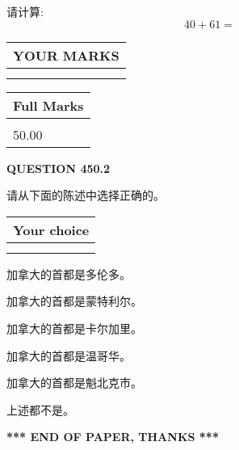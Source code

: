 \documentclass{ctexart}
\begin{document}
  
 
请计算:
\begin{equation}
40 +  %
61 = \nonumber
\end{equation}
 

 

 
  
\vspace{0.2in}
  
\noindent\begin{tabular}{|l|}
\hline
 YOUR MARKS  \\
\hline
 \\ 
 \\ 
\hline
\end{tabular}
\hspace{0.05in} \begin{tabular}{|l|}
\hline
 Full Marks  \\
\hline
 \\ 
50.00 \\
\hline
\end{tabular}
{\textbf{\Large{QUESTION
450.2 
}}}
  
  
请从下面的陈述中选择正确的。
  
  
\noindent\hspace{3.0in} \begin{tabular}{|l|}
\hline
Your choice \\
\hline
 \\ 
 \\ 
\hline
\end{tabular}
  
  
 
 
加拿大的首都是多伦多。
 
 
加拿大的首都是蒙特利尔。
 
 
加拿大的首都是卡尔加里。
 
 
加拿大的首都是温哥华。
 
 
加拿大的首都是魁北克市。
 
 
 上述都不是。
 
 
   
   
 \vspace{0.2in}
 
   
   
   
   
\vspace{1.0in} 
{\textbf{\large{ *** END OF PAPER, THANKS *** }}} 
   
\end{document}
